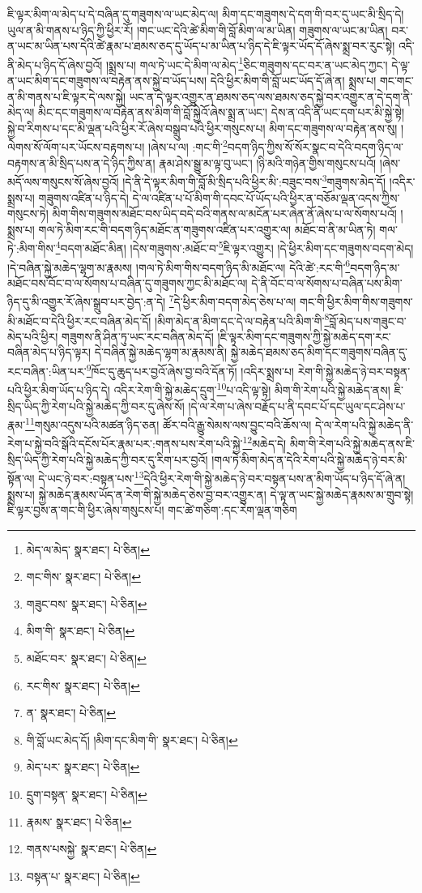 ཇི་ལྟར་མིག་ལ་མེད་པ་དེ་བཞིན་དུ་གཟུགས་ལ་ཡང་མེད་ལ། མིག་དང་གཟུགས་དེ་དག་གི་བར་དུ་ཡང་མི་སྲིད་དེ། ཡུལ་ན་མི་གནས་པ་ཉིད་ཀྱི་ཕྱིར་རོ། །གང་ཡང་དེའི་ཚེ་མིག་གི་བློ་མིག་ལ་མ་ཡིན། གཟུགས་ལ་ཡང་མ་ཡིན། བར་ན་ཡང་མ་ཡིན་པས་དེའི་ཚེ་རྣམ་པ་ཐམས་ཅད་དུ་ཡོད་པ་མ་ཡིན་པ་ཉིད་དེ་ཇི་ལྟར་ཡོད་དོ་ཞེས་སྨྲ་བར་རུང་སྟེ། འདི་ནི་མེད་པ་ཉིད་དོ་ཞེས་བྱའོ། །སྨྲས་པ། གལ་ཏེ་ཡང་དེ་མིག་ལ་མེད་\footnote{མེད་ལ་མེད་  སྣར་ཐང་།  པེ་ཅིན། }ཅིང་གཟུགས་དང་བར་ན་ཡང་མེད་ཀྱང་། དེ་ལྟ་ན་ཡང་མིག་དང་གཟུགས་ལ་བརྟེན་ནས་སྐྱེ་བ་ཡོད་པས། དེའི་ཕྱིར་མིག་གི་བློ་ཡང་ཡོད་དོ་ཞེ་ན། སྨྲས་པ། གང་གང་ན་མི་གནས་པ་ཇི་ལྟར་དེ་ལས་སྐྱེ། ཡང་ན་དེ་ལྟར་འགྱུར་ན་ཐམས་ཅད་ལས་ཐམས་ཅད་སྐྱེ་བར་འགྱུར་ན་དེ་དག་ནི་མེད་ལ། མིང་དང་གཟུགས་ལ་བརྟེན་ནས་མིག་གི་བློ་སྐྱེའོ་ཞེས་སྨྲ་ན་ཡང་། དེས་ན་འདི་ནི་ཡང་དག་པར་མི་སྐྱེ་སྟེ། སྐྱེ་བ་རིགས་པ་དང་མི་ལྡན་པའི་ཕྱིར་རོ་ཞེས་བསྒྲུབ་པའི་ཕྱིར་གསུངས་པ། མིག་དང་གཟུགས་ལ་བརྟེན་ནས་སུ། །ལེགས་སོ་ལོག་པར་ཡོངས་བརྟགས་པ། །ཞེས་པ་ལ། :གང་གི་\footnote{གང་གིས་  སྣར་ཐང་།  པེ་ཅིན། }བདག་ཉིད་ཀྱིས་སོ་སོར་སྣང་བ་དེའི་བདག་ཉིད་ལ་བརྟགས་ན་མི་སྲིད་པས་ན་དེ་ཉིད་ཀྱིས་ན། རྣམ་ཤེས་སྒྱུ་མ་ལྟ་བུ་ཡང་། །ཉི་མའི་གཉེན་གྱིས་གསུངས་པའོ། །ཞེས་མདོ་ལས་གསུངས་སོ་ཞེས་བྱའོ། །དེ་ནི་དེ་ལྟར་མིག་གི་བློ་མི་སྲིད་པའི་ཕྱིར་མི་:བཟུང་བས་\footnote{གཟུང་བས་  སྣར་ཐང་།  པེ་ཅིན། }གཟུགས་མེད་དོ། །འདིར་སྨྲས་པ། གཟུགས་འཛིན་པ་ཉིད་དེ། དེ་ལ་འཛིན་པ་པོ་མིག་གི་དབང་པོ་ཡོད་པའི་ཕྱིར་ན་བཅོམ་ལྡན་འདས་ཀྱིས་གསུངས་ཏེ། མིག་གིས་གཟུགས་མཐོང་བས་ཡིད་བདེ་བའི་གནས་ལ་མངོན་པར་ཞེན་ནོ་ཞེས་པ་ལ་སོགས་པའོ། །སྨྲས་པ། གལ་ཏེ་མིག་རང་གི་བདག་ཉིད་མཐོང་ན་གཟུགས་འཛིན་པར་འགྱུར་ལ། མཐོང་བ་ནི་མ་ཡིན་ཏེ། གལ་ཏེ་:མིག་གིས་\footnote{མིག་གི་  སྣར་ཐང་།  པེ་ཅིན། }བདག་མཐོང་མིན། །དེས་གཟུགས་:མཐོང་བ་\footnote{མཐོང་བར་  སྣར་ཐང་།  པེ་ཅིན། }ཇི་ལྟར་འགྱུར། །དེ་ཕྱིར་མིག་དང་གཟུགས་བདག་མེད། །དེ་བཞིན་སྐྱེ་མཆེད་ལྷག་མ་རྣམས། །གལ་ཏེ་མིག་གིས་བདག་ཉིད་མི་མཐོང་ལ། དེའི་ཚེ་:རང་གི་\footnote{རང་གིས་  སྣར་ཐང་།  པེ་ཅིན། }བདག་ཉིད་མ་མཐོང་བས་བོང་བ་ལ་སོགས་པ་བཞིན་དུ་གཟུགས་ཀྱང་མི་མཐོང་ལ། དེ་ནི་བོང་བ་ལ་སོགས་པ་བཞིན་པས་མིག་ཉིད་དུ་མི་འགྱུར་རོ་ཞེས་སྒྲུབ་པར་བྱེད་:ན་དེ། \footnote{ན་  སྣར་ཐང་།  པེ་ཅིན། }དེ་ཕྱིར་མིག་བདག་མེད་ཅེས་པ་ལ། གང་གི་ཕྱིར་མིག་གིས་གཟུགས་མི་མཐོང་བ་དེའི་ཕྱིར་རང་བཞིན་མེད་དོ། །མིག་མེད་ན་མིག་དང་དེ་ལ་བརྟེན་པའི་མིག་གི་\footnote{གི་བློ་ཡང་མེད་དོ། །མིག་དང་མིག་གི་  སྣར་ཐང་།  པེ་ཅིན། }བློ་མེད་པས་གཟུང་བ་མེད་པའི་ཕྱིར། གཟུགས་ནི་ཤིན་ཏུ་ཡང་རང་བཞིན་མེད་དོ། །ཇི་ལྟར་མིག་དང་གཟུགས་ཀྱི་སྐྱེ་མཆེད་དག་རང་བཞིན་མེད་པ་ཉིད་ལྟར། དེ་བཞིན་སྐྱེ་མཆེད་ལྷག་མ་རྣམས་ནི། སྐྱེ་མཆེད་ཐམས་ཅད་མིག་དང་གཟུགས་བཞིན་དུ་རང་བཞིན་:ཡིན་པར་\footnote{མེད་པར་  སྣར་ཐང་།  པེ་ཅིན། }ཁོང་དུ་ཆུད་པར་བྱའོ་ཞེས་བྱ་བའི་དོན་ཏོ། །འདིར་སྨྲས་པ། རེག་གི་སྐྱེ་མཆེད་ཉེ་བར་བསྟན་པའི་ཕྱིར་མིག་ཡོད་པ་ཉིད་དེ། འདིར་རེག་གི་སྐྱེ་མཆེད་དྲུག་\footnote{དྲུག་བསྟན་  སྣར་ཐང་།  པེ་ཅིན། }པ་འདི་ལྟ་སྟེ། མིག་གི་རེག་པའི་སྐྱེ་མཆེད་ནས། ཇི་སྲིད་ཡིད་ཀྱི་རེག་པའི་སྐྱེ་མཆེད་ཀྱི་བར་དུ་ཞེས་སོ། །དེ་ལ་རེག་པ་ཞེས་བརྗོད་པ་ནི་དབང་པོ་དང་ཡུལ་དང་ཤེས་པ་རྣམ་\footnote{རྣམས་  སྣར་ཐང་།  པེ་ཅིན། }གསུམ་འདུས་པའི་མཚན་ཉིད་ཅན། ཚོར་བའི་རྒྱུ་སེམས་ལས་བྱུང་བའི་ཆོས་ལ། དེ་ལ་རེག་པའི་སྐྱེ་མཆེད་ནི་རེག་པ་སྐྱེ་བའི་སྒོའི་དངོས་པོར་རྣམ་པར་:གནས་པས་རེག་པའི་སྐྱེ་\footnote{གནས་པསསྐྱེ་  སྣར་ཐང་།  པེ་ཅིན། }མཆེད་དེ། མིག་གི་རེག་པའི་སྐྱེ་མཆེད་ནས་ཇི་སྲིད་ཡིད་ཀྱི་རེག་པའི་སྐྱེ་མཆེད་ཀྱི་བར་དུ་རིག་པར་བྱའོ། །གལ་ཏེ་མིག་མེད་ན་དེའི་རེག་པའི་སྐྱེ་མཆེད་ཉེ་བར་མི་སྟོན་ལ། དེ་ཡང་ཉེ་བར་:བསྟན་པས་\footnote{བསྟན་པ་  སྣར་ཐང་།  པེ་ཅིན། }དེའི་ཕྱིར་རེག་གི་སྐྱེ་མཆེད་ཉེ་བར་བསྟན་པས་ན་མིག་ཡོད་པ་ཉིད་དོ་ཞེ་ན། སྨྲས་པ། སྐྱེ་མཆེད་རྣམས་ཡོད་ན་རེག་གི་སྐྱེ་མཆེད་ཅེས་བྱ་བར་འགྱུར་ན། དེ་ལྟ་ན་ཡང་སྐྱེ་མཆེད་རྣམས་མ་གྲུབ་སྟེ། ཇི་ལྟར་བྱས་ན་གང་གི་ཕྱིར་ཞེས་གསུངས་པ། གང་ཚེ་གཅིག་:དང་རེག་ལྡན་གཅིག 